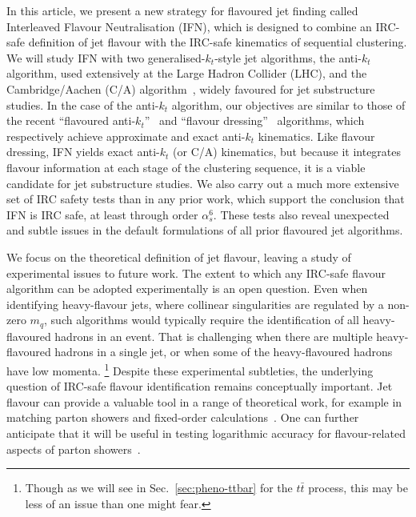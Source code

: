 \documentclass[nofootinbib,twocolumn,preprintnumbers,superscriptaddress,aps]{revtex4-2}
\begin{document}
In this article, we present a new strategy for flavoured jet finding called Interleaved Flavour Neutralisation (IFN), which is designed to combine an
IRC-safe definition of jet flavour with the IRC-safe kinematics of sequential clustering.
%
We will study IFN with two generalised-$k_t$-style jet algorithms, the
anti-$k_t$ algorithm, used extensively at the Large Hadron Collider
(LHC), and the Cambridge/Aachen
(C/A) algorithm~\cite{Dokshitzer:1997in,Wobisch:1998wt}, widely favoured for jet substructure studies.
%
In the case of the anti-$k_t$ algorithm, our objectives are similar to
those of the recent ``flavoured anti-$k_t$''~\cite{Czakon:2022wam} and
``flavour dressing''~\cite{Gauld:2022lem} algorithms, which respectively achieve
approximate and exact anti-$k_t$ kinematics.
%
Like flavour dressing, IFN yields exact anti-$k_t$ (or
C/A) kinematics, but because it integrates flavour information at each 
stage of the clustering sequence, it is a viable candidate for jet substructure studies.
%
We also carry out a much more extensive set of IRC safety tests than
in any prior work, which support the conclusion that IFN is IRC safe,
at least through order $\alpha_s^6$.
%
These tests also reveal unexpected and subtle issues in the default formulations of all prior flavoured jet
algorithms. 


We focus on the theoretical definition of jet flavour, leaving a study of experimental issues to future work.
%
The extent to which any IRC-safe flavour algorithm can be adopted
experimentally is an open question.
%
Even when identifying heavy-flavour jets, where collinear singularities are regulated by a non-zero $m_q$, such algorithms
would typically require the identification of all heavy-flavoured hadrons in
an event.
%
That is challenging when there are multiple heavy-flavoured hadrons in
a single jet, or when some of the heavy-flavoured hadrons have low
momenta.%
%
\footnote{Though as we will see in Sec.~\ref{sec:pheno-ttbar} for the $t\bar t$ process, this may be less of an issue than one might fear.}
%
Despite these experimental subtleties, the underlying question of IRC-safe flavour identification
remains conceptually important.
%
Jet flavour can provide a valuable tool in a range of theoretical
work,
% 
for example in matching parton showers and fixed-order
calculations~\cite{Hoeche:2009rj}.
%
One can further anticipate that it will be useful in testing
logarithmic accuracy for flavour-related aspects of parton
showers~\cite{Karlberg:2021kwr,vanBeekveld:2022ukn}.
\end{document}
